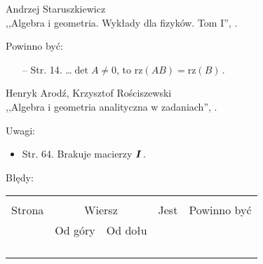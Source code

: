\documentclass[a4paper,11pt]{article}
\begin{document}
\begin{center}
  Andrzej Staruszkiewicz \\
  ,,Algebra i geometria. Wykłady dla fizyków. Tom I'', \cite{ASAG}.
\end{center}


Powinno być:
\begin{itemize}
\item[--] Str. 14. \ldots $\det A \neq 0$, to
  $\textrm{rz} ( AB ) = \textrm{rz} ( B ) \, .$
\end{itemize}


\begin{center}
  Henryk Arodź, Krzysztof Rościszewski\\
  ,,Algebra i geometria analityczna w zadaniach'', \cite{AR}.
\end{center}


Uwagi:
\begin{itemize}
\item Str. 64. Brakuje macierzy $\boldsymbol{I} \, .$
\end{itemize}

Błędy:\\
\begin{tabular}{|c|c|c|c|c|}
  \hline
  & \multicolumn{2}{c|}{} & & \\
  Strona & \multicolumn{2}{c|}{Wiersz} & Jest
                            & Powinno być \\ \cline{2-3}
  & Od góry & Od dołu & & \\
  \hline
  & & & & \\
  & & & & \\
  & & & & \\
  & & & & \\
  \hline
\end{tabular}
\end{document}
